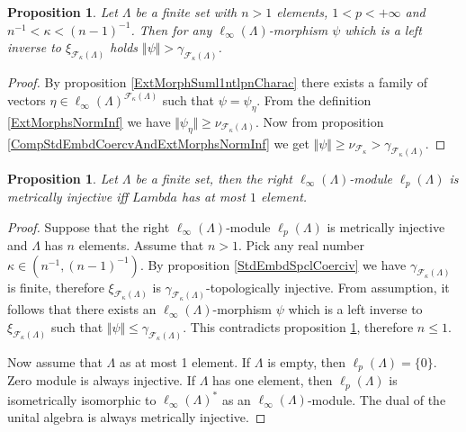 \documentclass[12pt]{article}
\newtheorem{proposition}[theorem]{Proposition}
\begin{document}
\begin{proposition}\label{RetrPrblmNoSln}
    Let $\Lambda$ be a finite set with $n>1$ elements, $1<p<+\infty$ 
    and $n^{-1}<\kappa<(n-1)^{-1}$. Then for any $\ell_\infty(\Lambda)$-morphism
    $\psi$ which is a left inverse to $\xi_{\mathcal{F}_{\kappa}(\Lambda)}$ 
    holds $\Vert \psi\Vert>\gamma_{\mathcal{F}_{\kappa}(\Lambda)}$.  
\end{proposition}
\begin{proof}
    By proposition \ref{ExtMorphSuml1ntlpnCharac} there exists a family of 
    vectors $\eta\in\ell_\infty(\Lambda)^{\mathcal{F}_{\kappa}(\Lambda)}$ such 
    that $\psi=\psi_{\eta}$. From the definition \ref{ExtMorphsNormInf} we 
    have $\Vert \psi_{\eta}\Vert\geq \nu_{\mathcal{F}_{\kappa}(\Lambda)}$. Now 
    from proposition \ref{CompStdEmbdCoercvAndExtMorphsNormInf} we get 
    $
    \Vert\psi\Vert\geq\nu_{\mathcal{F}_{\kappa}}
    >
    \gamma_{\mathcal{F}_{\kappa}(\Lambda)}.
    $
\end{proof}

\begin{proposition}\label{linftnModlpnIsntMetInjCharac}
    Let $\Lambda$ be a finite set, then the right $\ell_\infty(\Lambda)$-module 
    $\ell_p(\Lambda)$ is metrically injective iff $Lambda$ has at most $1$ 
    element.
\end{proposition}
\begin{proof}
    Suppose that the right $\ell_\infty(\Lambda)$-module $\ell_p(\Lambda)$ is 
    metrically injective and $\Lambda$ has $n$ elements. Assume that $n>1$. 
    Pick any real number $\kappa\in(n^{-1},(n-1)^{-1})$. By 
    proposition \ref{StdEmbdSpclCoerciv} we 
    have $\gamma_{\mathcal{F}_{\kappa}(\Lambda)}$ is finite, 
    therefore $\xi_{\mathcal{F}_{\kappa}(\Lambda)}$ 
    is $\gamma_{\mathcal{F}_{\kappa}(\Lambda)}$-topologically injective. 
    From assumption, it follows that there exists 
    an $\ell_\infty(\Lambda)$-morphism $\psi$ which is a left inverse 
    to $\xi_{\mathcal{F}_{\kappa}(\Lambda)}$ such 
    that $\Vert\psi\Vert\leq \gamma_{\mathcal{F}_{\kappa}(\Lambda)}$. 
    This contradicts proposition \ref{linftnModlpnIsntMetInjCharac}, 
    therefore $n\leq 1$.

    Now assume that $\Lambda$ as at most 1 element. If $\Lambda$ is empty, then
    $\ell_p(\Lambda)=\{0\}$. Zero module is always injective. If $\Lambda$ has 
    one element, then $\ell_p(\Lambda)$ is isometrically isomorphic 
    to $\ell_\infty(\Lambda)^*$ as an $\ell_\infty(\Lambda)$-module. The dual of
    the unital algebra is always metrically injective.
\end{proof}
\end{document}
